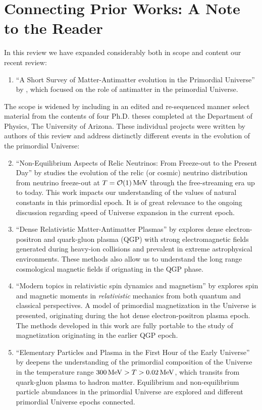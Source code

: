 \section{Connecting Prior Works: A Note to the Reader}\label{list:Works}
In this review we have expanded considerably both in scope and content our recent review:
\begin{enumerate}
\item ``A Short Survey of Matter-Antimatter evolution in the Primordial Universe'' by , which focused on the role of antimatter in the primordial Universe. 
\end{enumerate}
The scope is widened by including in an edited and re-sequenced manner select material from the contents of four Ph.D. theses completed at the Department of Physics, The University of Arizona. {\color{blue} These individual projects were written by authors of this review and address distinctly different events in the evolution of the primordial Universe:}
\begin{enumerate}
\setcounter{enumi}{1}
\item ``Non-Equilibrium Aspects of Relic Neutrinos: From Freeze-out to the Present Day'' by  studies the evolution of the relic (or cosmic) neutrino distribution from neutrino freeze-out at $T=\mathcal{O}(1)\text{\,MeV}$ through the free-streaming era up to today. {\color{blue} This work impacts our understanding of the values of natural constants in this primordial epoch. It is of great relevance to the ongoing discussion regarding speed of Universe expansion in the current epoch.}
%
\item ``Dense Relativistic Matter-Antimatter Plasmas'' by  explores dense electron-positron and quark-gluon plasma (QGP) with strong electromagnetic fields generated during heavy-ion collisions and prevalent in extreme astrophysical environments. {\color{blue} These methods also allow us to understand the long range cosmological magnetic fields if orignating in the QGP phase.}
%
\item ``Modern topics in relativistic spin dynamics and magnetism'' by  explores spin and magnetic moments in \emph{relativistic} mechanics from both
quantum and classical perspectives. A model of primordial magnetization in the Universe is presented, originating during the hot dense electron-positron plasma epoch. {\color{blue} The methods developed in this work are fully portable to the study of magnetization originating in the earlier QGP epoch.}
%
\item ``Elementary Particles and Plasma in the First Hour of the Early Universe'' by  deepens the understanding of the primordial composition of the Universe in the temperature range $300 \text{\,MeV}>T>0.02\text{\,MeV}$, which transits from quark-gluon plasma to hadron matter. {\color{blue} Equilibrium and non-equilibrium particle abundances in the primordial Universe are explored and different primordial Universe epochs connected.}
\end{enumerate}

